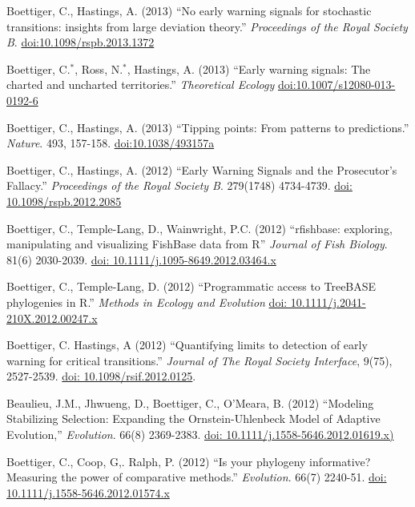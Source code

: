 \documentclass[margin]{res}
\begin{document}
\begin{resume}
\begin{etaremune}[start = 11]
\item  Boettiger, C., Hastings, A. (2013) ``No early warning signals for stochastic transitions: insights from large deviation theory.'' {\it Proceedings of the Royal Society B}. \href{http://doi.org/10.1098/rspb.2013.1372}{doi:10.1098/rspb.2013.1372}
\item  Boettiger, C.$^*$, Ross, N.$^*$, Hastings, A. (2013) ``Early warning signals: The charted and uncharted territories.'' {\it Theoretical Ecology} \href{http://doi.org/10.1007/s12080-013-0192-6}{doi:10.1007/s12080-013-0192-6}
\item  Boettiger, C., Hastings, A. (2013) ``Tipping points: From patterns to predictions.'' {\it Nature}. 493, 157-158. \href{http://dx.doi.org/10.1038/493157a}{doi:10.1038/493157a}
\item Boettiger, C., Hastings, A. (2012) ``Early Warning Signals and the Prosecutor's Fallacy.'' {\it Proceedings of the Royal Society B}. 279(1748) 4734-4739.   \href{http://dx.doi.org/10.1098/rspb.2012.2085}{doi: 10.1098/rspb.2012.2085}
\item Boettiger, C., Temple-Lang, D., Wainwright, P.C. (2012) ``rfishbase: exploring, manipulating and visualizing FishBase data from R'' {\it Journal of Fish Biology}. 81(6) 2030-2039. \href{http://dx.doi.org/10.1111/j.1095-8649.2012.03464.x}{doi: 10.1111/j.1095-8649.2012.03464.x}
\item Boettiger, C., Temple-Lang, D. (2012)  ``Programmatic access to TreeBASE phylogenies in R.'' {\it Methods in Ecology and Evolution}  \href{http://dx.doi.org/10.1111/j.2041-210X.2012.00247.x}{doi: 10.1111/j.2041-210X.2012.00247.x}
\item Boettiger, C. Hastings, A (2012) ``Quantifying limits to detection of early warning for critical transitions.'' {\it Journal of The Royal Society Interface},  9(75), 2527-2539. \href{http://dx.doi.org/10.1098/rsif.2012.0125}{doi: 10.1098/rsif.2012.0125}.
\item Beaulieu, J.M., Jhwueng, D., Boettiger, C., O'Meara, B. (2012) ``Modeling Stabilizing Selection: Expanding the Ornstein-Uhlenbeck Model of Adaptive Evolution,'' {\it Evolution}. 66(8) 2369-2383. \href{http://dx.doi.org/10.1111/j.1558-5646.2012.01619.x}{doi: 10.1111/j.1558-5646.2012.01619.x)}
\item Boettiger, C., Coop, G,. Ralph, P. (2012) ``Is your phylogeny informative? Measuring the power of comparative methods.'' {\it Evolution}. 66(7) 2240-51. \href{http://dx.doi.org/10.1111/j.1558-5646.2012.01574.x}{doi: 10.1111/j.1558-5646.2012.01574.x}

\end{etaremune}
\end{resume}
\end{document}
